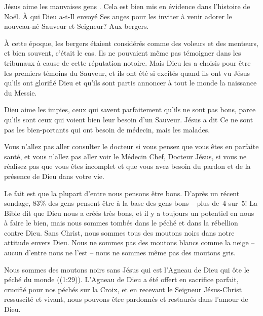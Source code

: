 

Jésus aime les \og mauvaises gens \fg{}. Cela est bien mis en évidence dans l'histoire de Noël. À qui Dieu a-t-Il envoyé Ses anges pour les inviter à venir adorer le nouveau-né Sauveur et Seigneur? Aux bergers.

À cette époque, les bergers étaient considérés comme des voleurs et des menteurs, et bien souvent, c'était le cas. Ils ne pouvaient même pas témoigner dans les tribunaux à cause de cette réputation notoire. Mais Dieu les a choisis pour être les premiers témoins du Sauveur, et ils ont été si excités quand ils ont vu Jésus qu'ils ont glorifié Dieu et qu'ils sont partis annoncer à tout le monde la naissance du Messie.

Dieu aime les impies, ceux qui savent parfaitement qu'ils ne sont pas bons, parce qu'ils sont ceux qui voient bien leur besoin d'un Sauveur. Jésus a dit\frcolon{} \og Ce ne sont pas les bien-portants qui ont besoin de médecin, mais les malades. \fg{}

Vous n'allez pas aller consulter le docteur si vous pensez que vous êtes en parfaite santé, et vous n'allez pas aller voir le Médecin Chef, Docteur Jésus, si vous ne réalisez pas que vous êtes incomplet et que vous avez besoin du pardon et de la présence de Dieu dans votre vie.

Le fait est que la plupart d'entre nous pensons être bons. D'après un récent sondage, 83\% des gens pensent être à la base des gens bons – plus de~4 sur~5! La Bible dit que Dieu nous a créés très bons, et il y a toujours un potentiel en nous à faire le bien, mais nous sommes tombés dans le péché et dans la rébellion contre Dieu. Sans Christ, nous sommes tous des moutons noirs dans notre attitude envers Dieu. Nous ne sommes pas des moutons blancs comme la neige – aucun d'entre nous ne l'est – nous ne sommes même pas des moutons gris.

Nous sommes des moutons noirs sans Jésus qui est \og l'Agneau de Dieu qui ôte le péché du monde \fg{} ((1:29)). L'Agneau de Dieu a été offert en sacrifice parfait, crucifié pour nos péchés sur la Croix, et en recevant le Seigneur Jésus-Christ ressuscité et vivant, nous pouvons être pardonnés et restaurés dans l'amour de Dieu.

